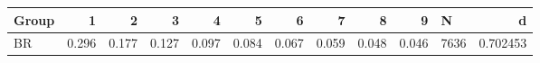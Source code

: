 \begin{tabular}{lrrrrrrrrrlr}
\toprule
Group &      1 &      2 &      3 &      4 &      5 &      6 &      7 &      8 &      9 &     N &         d \\
\midrule
   BR &  0.296 &  0.177 &  0.127 &  0.097 &  0.084 &  0.067 &  0.059 &  0.048 &  0.046 &  7636 &  0.702453 \\
\bottomrule
\end{tabular}
